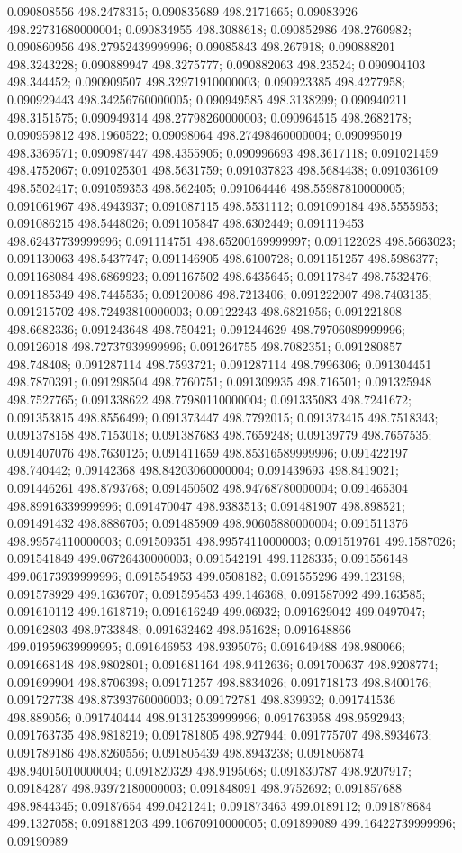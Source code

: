 0.090808556 498.2478315; 0.090835689 498.2171665; 0.09083926 498.22731680000004; 0.090834955 498.3088618; 0.090852986 498.2760982; 0.090860956 498.27952439999996; 0.09085843 498.267918; 0.090888201 498.3243228; 0.090889947 498.3275777; 0.090882063 498.23524; 0.090904103 498.344452; 0.090909507 498.32971910000003; 0.090923385 498.4277958; 0.090929443 498.34256760000005; 0.090949585 498.3138299; 0.090940211 498.3151575; 0.090949314 498.27798260000003; 0.090964515 498.2682178; 0.090959812 498.1960522; 0.09098064 498.27498460000004; 0.090995019 498.3369571; 0.090987447 498.4355905; 0.090996693 498.3617118; 0.091021459 498.4752067; 0.091025301 498.5631759; 0.091037823 498.5684438; 0.091036109 498.5502417; 0.091059353 498.562405; 0.091064446 498.55987810000005; 0.091061967 498.4943937; 0.091087115 498.5531112; 0.091090184 498.5555953; 0.091086215 498.5448026; 0.091105847 498.6302449; 0.091119453 498.62437739999996; 0.091114751 498.65200169999997; 0.091122028 498.5663023; 0.091130063 498.5437747; 0.091146905 498.6100728; 0.091151257 498.5986377; 0.091168084 498.6869923; 0.091167502 498.6435645; 0.09117847 498.7532476; 0.091185349 498.7445535; 0.09120086 498.7213406; 0.091222007 498.7403135; 0.091215702 498.72493810000003; 0.09122243 498.6821956; 0.091221808 498.6682336; 0.091243648 498.750421; 0.091244629 498.79706089999996; 0.09126018 498.72737939999996; 0.091264755 498.7082351; 0.091280857 498.748408; 0.091287114 498.7593721; 0.091287114 498.7996306; 0.091304451 498.7870391; 0.091298504 498.7760751; 0.091309935 498.716501; 0.091325948 498.7527765; 0.091338622 498.77980110000004; 0.091335083 498.7241672; 0.091353815 498.8556499; 0.091373447 498.7792015; 0.091373415 498.7518343; 0.091378158 498.7153018; 0.091387683 498.7659248; 0.09139779 498.7657535; 0.091407076 498.7630125; 0.091411659 498.85316589999996; 0.091422197 498.740442; 0.09142368 498.84203060000004; 0.091439693 498.8419021; 0.091446261 498.8793768; 0.091450502 498.94768780000004; 0.091465304 498.89916339999996; 0.091470047 498.9383513; 0.091481907 498.898521; 0.091491432 498.8886705; 0.091485909 498.90605880000004; 0.091511376 498.99574110000003; 0.091509351 498.99574110000003; 0.091519761 499.1587026; 0.091541849 499.06726430000003; 0.091542191 499.1128335; 0.091556148 499.06173939999996; 0.091554953 499.0508182; 0.091555296 499.123198; 0.091578929 499.1636707; 0.091595453 499.146368; 0.091587092 499.163585; 0.091610112 499.1618719; 0.091616249 499.06932; 0.091629042 499.0497047; 0.09162803 498.9733848; 0.091632462 498.951628; 0.091648866 499.01959639999995; 0.091646953 498.9395076; 0.091649488 498.980066; 0.091668148 498.9802801; 0.091681164 498.9412636; 0.091700637 498.9208774; 0.091699904 498.8706398; 0.09171257 498.8834026; 0.091718173 498.8400176; 0.091727738 498.87393760000003; 0.09172781 498.839932; 0.091741536 498.889056; 0.091740444 498.91312539999996; 0.091763958 498.9592943; 0.091763735 498.9818219; 0.091781805 498.927944; 0.091775707 498.8934673; 0.091789186 498.8260556; 0.091805439 498.8943238; 0.091806874 498.94015010000004; 0.091820329 498.9195068; 0.091830787 498.9207917; 0.09184287 498.93972180000003; 0.091848091 498.9752692; 0.091857688 498.9844345; 0.09187654 499.0421241; 0.091873463 499.0189112; 0.091878684 499.1327058; 0.091881203 499.10670910000005; 0.091899089 499.16422739999996; 0.09190989 